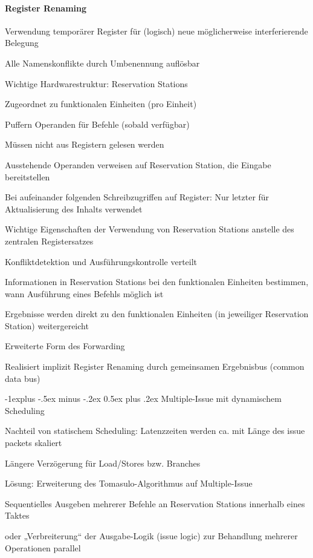 \documentclass[10pt,landscape]{article}
\makeatletter
\renewcommand{\subsection}{\@startsection{subsection}{2}{0mm}%
                                {-1explus -.5ex minus -.2ex}%
                                {0.5ex plus .2ex}%
                                {\normalfont\normalsize\bfseries}}
\makeatother
\begin{document}
\begin{multicols}{3}
  \paragraph{Register Renaming}
  \begin{itemize*}
    \item Verwendung temporärer Register für (logisch) neue möglicherweise interferierende Belegung
    \item Alle Namenskonflikte durch Umbenennung auflösbar
    \item Wichtige Hardwarestruktur: Reservation Stations
    \item Zugeordnet zu funktionalen Einheiten (pro Einheit)
    \item Puffern Operanden für Befehle (sobald verfügbar)
    \item Müssen nicht aus Registern gelesen werden
    \item Ausstehende Operanden verweisen auf Reservation Station, die Eingabe bereitstellen
    \item Bei aufeinander folgenden Schreibzugriffen auf Register: Nur letzter für Aktualisierung des Inhalts verwendet
    \item Wichtige Eigenschaften der Verwendung von Reservation Stations anstelle des zentralen Registersatzes
    \item Konfliktdetektion und Ausführungskontrolle verteilt
    \item Informationen in Reservation Stations bei den funktionalen Einheiten bestimmen, wann Ausführung eines Befehls möglich ist
    \item Ergebnisse werden direkt zu den funktionalen Einheiten (in jeweiliger Reservation Station) weitergereicht
    \item Erweiterte Form des Forwarding
    \item Realisiert implizit Register Renaming durch gemeinsamen Ergebnisbus (common data bus)
  \end{itemize*}
  
  \subsection{Multiple-Issue mit dynamischem Scheduling}
  \begin{itemize*}
    \item Nachteil von statischem Scheduling: Latenzzeiten werden ca. mit Länge des issue packets skaliert
    \item Längere Verzögerung für Load/Stores bzw. Branches
    \item Lösung: Erweiterung des Tomasulo-Algorithmus auf Multiple-Issue
    \item Sequentielles Ausgeben mehrerer Befehle an Reservation Stations innerhalb eines Taktes
    \item oder „Verbreiterung“ der Ausgabe-Logik (issue logic) zur Behandlung mehrerer Operationen parallel
  \end{itemize*}
  

\end{multicols}
\end{document}
